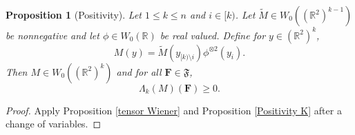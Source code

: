 \documentclass[12pt,reqno]{amsart}
\theoremstyle{plain}
\newtheorem{proposition}[theorem]{Proposition}
\numberwithin{equation}{section}
\theoremstyle{remark}
\newcommand{\uses}[1]{}
\newcommand{\usesdefs}[1]{}
\newcommand{\R}{{\mathbb R}}
\newcommand{\F}{\mathbf{F}}
\begin{document}
\begin{proposition}[Positivity]\label{Positivity M}\uses{tensor Wiener,Positivity K}\usesdefs{auto:Wiener-space-definition,normalized function tuples,prism Brascamp--Lieb,auto:prism-form-definition}
Let $1\le k\le n$ and $i\in [k)$. Let $\tilde{M}\in W_0((\R^2)^{k-1})$ be nonnegative
and let $\phi\in W_0(\R)$ be real valued. Define for $y\in (\R^2)^k$,
\begin{equation}\label{auto:positive-prism-product-kernel}
    M(y)=\tilde{M}(y_{[k)\setminus i}) \phi^{\otimes 2}(y_{i}).
\end{equation}
Then $M\in W_0((\R^2)^k)$ and for all $\F\in {\mathfrak{F}}$,
\begin{equation}\label{auto:positive-prism-form}
    \Lambda_k(M)(\F)\ge 0.
\end{equation}
\end{proposition}

\begin{proof}
    Apply Proposition \ref{tensor Wiener} and Proposition \ref{Positivity K} after a change of variables.
\end{proof}
\end{document}
